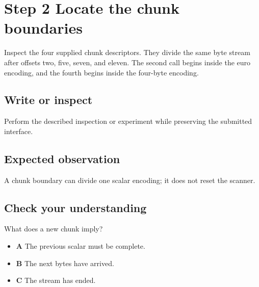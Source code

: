 \section{Step 2 Locate the chunk boundaries}\label{utf8-s02}

Inspect the four supplied chunk descriptors. They divide the same byte stream after offsets two, five, seven, and eleven. The second call begins inside the euro encoding, and the fourth begins inside the four-byte encoding.

\subsection{Write or inspect}
Perform the described inspection or experiment while preserving the submitted interface.

\subsection{Expected observation}
A chunk boundary can divide one scalar encoding; it does not reset the scanner.

\subsection{Check your understanding}
What does a new chunk imply?

\begin{itemize}
  \item \textbf{A} The previous scalar must be complete.
  \item \textbf{B} The next bytes have arrived.
  \item \textbf{C} The stream has ended.
\end{itemize}
